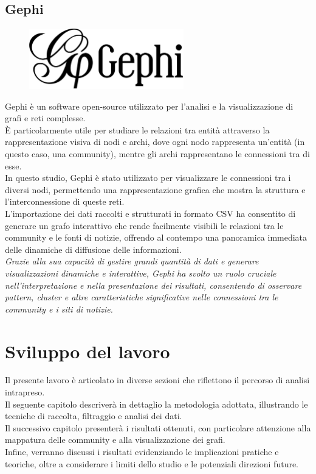 \documentclass[12pt]{article}
\begin{document}
	\subsection{Gephi}
		\begin{figure}[H]
		\centering
		\includegraphics[width=0.6\textwidth]{immagini/gephilogo}
	\end{figure}
	Gephi è un software open-source utilizzato per l'analisi e la visualizzazione di grafi e reti complesse. \\È particolarmente utile per studiare le relazioni tra entità attraverso la rappresentazione visiva di nodi e archi, dove ogni nodo rappresenta un'entità (in questo caso, una community), mentre gli archi rappresentano le connessioni tra di esse. \\In questo studio, Gephi è stato utilizzato per visualizzare le connessioni tra i diversi nodi, permettendo una rappresentazione grafica che mostra la struttura e l'interconnessione di queste reti. \\L'importazione dei dati raccolti e strutturati in formato CSV ha consentito di generare un grafo interattivo che rende facilmente visibili le relazioni tra le community e le fonti di notizie, offrendo al contempo una panoramica immediata delle dinamiche di diffusione delle informazioni.\\ 
	\textit{Grazie alla sua capacità di gestire grandi quantità di dati e generare visualizzazioni dinamiche e interattive, Gephi ha svolto un ruolo cruciale nell'interpretazione e nella presentazione dei risultati, consentendo di osservare pattern, cluster e altre caratteristiche significative nelle connessioni tra le community e i siti di notizie.}
	\newpage
	\section{Sviluppo del lavoro}
	Il presente lavoro è articolato in diverse sezioni che riflettono il percorso di analisi intrapreso.\\
	Il seguente capitolo descriverà in dettaglio la metodologia adottata, illustrando le tecniche di raccolta, filtraggio e analisi dei dati.\\
	Il successivo capitolo presenterà i risultati ottenuti, con particolare attenzione alla mappatura delle community e alla visualizzazione dei grafi.\\
	Infine, verranno discussi i risultati evidenziando le implicazioni pratiche e teoriche, oltre a considerare i limiti dello studio e le potenziali direzioni future.
\end{document}
